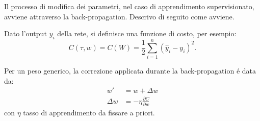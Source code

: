 \documentclass[a4paper,10pt]{article}
\begin{document}
 Il processo di modifica dei parametri, nel caso di apprendimento supervisionato, avviene attraverso la back-propagation. Descrivo di seguito come avviene.
 
 Dato l'output $y_i$ della rete, si definisce una funzione di costo, per esempio:
 \begin{equation}
  C(\tau,w) = C(W) = \frac{1}{2} \sum_{i=1}^n (\widehat{y}_i-y_i)^2.
 \end{equation}
 
 Per un peso generico, la correzione applicata durante la back-propagation \'e data da:
 \begin{align}
  w' &= w + \Delta w \\
  \Delta w &= - \eta \frac{\partial C}{\partial w}
 \end{align}
 con $\eta$ tasso di apprendimento da fissare a priori.
 
\end{document}
